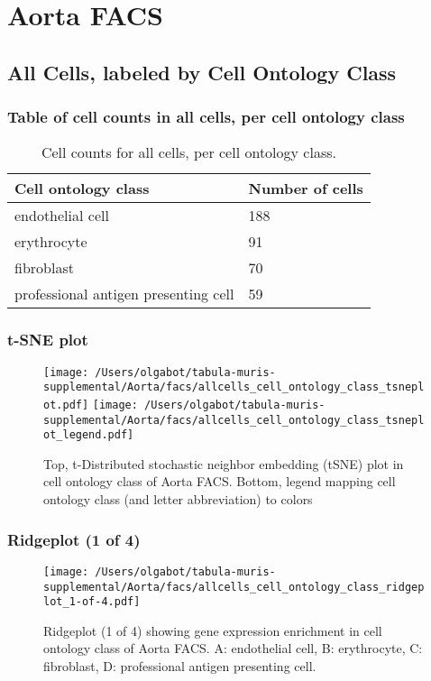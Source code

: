 \clearpage
\section{Aorta FACS}

\subsection{All Cells, labeled by Cell Ontology Class}
\subsubsection{Table of cell counts in all cells, per cell ontology class}\begin{table}[h]
\centering
\label{my-label}
\begin{tabular}{@{}ll@{}}
\toprule

Cell ontology class& Number of cells \\ \midrule
endothelial cell & 188 \\

erythrocyte & 91 \\

fibroblast & 70 \\

professional antigen presenting cell & 59 \\
\bottomrule
\end{tabular}
\caption{Cell counts for all cells, per cell ontology class.}
\end{table}

\clearpage
\subsubsection{t-SNE plot}
\begin{figure}[h]
\centering
\texttt{[image: /Users/olgabot/tabula-muris-supplemental/Aorta/facs/allcells\_cell\_ontology\_class\_tsneplot.pdf]}
\texttt{[image: /Users/olgabot/tabula-muris-supplemental/Aorta/facs/allcells\_cell\_ontology\_class\_tsneplot\_legend.pdf]}
\caption{Top, t-Distributed stochastic neighbor embedding (tSNE) plot  in cell ontology class of Aorta FACS. Bottom, legend mapping cell ontology class (and letter abbreviation) to colors}
\end{figure}


\clearpage
\clearpage
\subsubsection{Ridgeplot (1 of 4)}
\begin{figure}[h]
\centering
\texttt{[image: /Users/olgabot/tabula-muris-supplemental/Aorta/facs/allcells\_cell\_ontology\_class\_ridgeplot\_1-of-4.pdf]}

\caption{ Ridgeplot (1 of 4)  showing gene expression enrichment in cell ontology class of Aorta FACS. A: endothelial cell, B: erythrocyte, C: fibroblast, D: professional antigen presenting cell.}
\end{figure}


